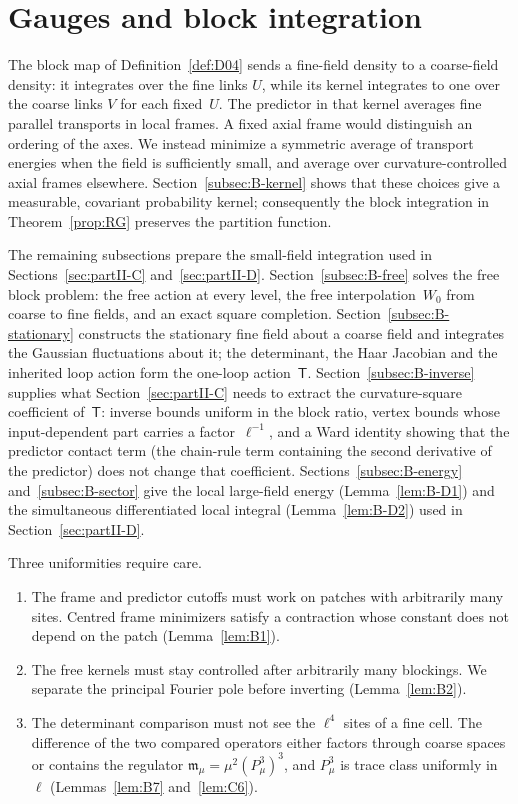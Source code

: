 \section{Gauges and block integration}\label{sec:partII-B}

The block map of Definition~\ref{def:D04} sends a fine-field density to a coarse-field density: it integrates over the fine links $U$, while its kernel integrates to one over the coarse links $V$ for each fixed~$U$. The predictor in that kernel averages fine parallel transports in local frames. A fixed axial frame would distinguish an ordering of the axes. We instead minimize a symmetric average of transport energies when the field is sufficiently small, and average over curvature-controlled axial frames elsewhere. Section~\ref{subsec:B-kernel} shows that these choices give a measurable, covariant probability kernel; consequently the block integration in Theorem~\ref{prop:RG} preserves the partition function.

The remaining subsections prepare the small-field integration used in Sections~\ref{sec:partII-C} and~\ref{sec:partII-D}. Section~\ref{subsec:B-free} solves the free block problem: the free action at every level, the free interpolation~$W_0$ from coarse to fine fields, and an exact square completion. Section~\ref{subsec:B-stationary} constructs the stationary fine field about a coarse field and integrates the Gaussian fluctuations about it; the determinant, the Haar Jacobian and the inherited loop action form the one-loop action~$\mathsf T$. Section~\ref{subsec:B-inverse} supplies what Section~\ref{sec:partII-C} needs to extract the curvature-square coefficient of~$\mathsf T$: inverse bounds uniform in the block ratio, vertex bounds whose input-dependent part carries a factor~$\ell^{-1}$, and a Ward identity showing that the predictor contact term (the chain-rule term containing the second derivative of the predictor) does not change that coefficient. Sections~\ref{subsec:B-energy} and~\ref{subsec:B-sector} give the local large-field energy (Lemma~\ref{lem:B-D1}) and the simultaneous differentiated local integral (Lemma~\ref{lem:B-D2}) used in Section~\ref{sec:partII-D}.

Three uniformities require care.
\begin{enumerate}[label=(\roman*)]
\item The frame and predictor cutoffs must work on patches with arbitrarily many sites. Centred frame minimizers satisfy a contraction whose constant does not depend on the patch (Lemma~\ref{lem:B1}).
\item The free kernels must stay controlled after arbitrarily many blockings. We separate the principal Fourier pole before inverting (Lemma~\ref{lem:B2}).
\item The determinant comparison must not see the $\ell^4$ sites of a fine cell. The difference of the two compared operators either factors through coarse spaces or contains the regulator $\mathfrak m_\mu=\mu^2(P_\mu^3)^3$, and $P_\mu^3$ is trace class uniformly in~$\ell$ (Lemmas~\ref{lem:B7} and~\ref{lem:C6}).
\end{enumerate}

